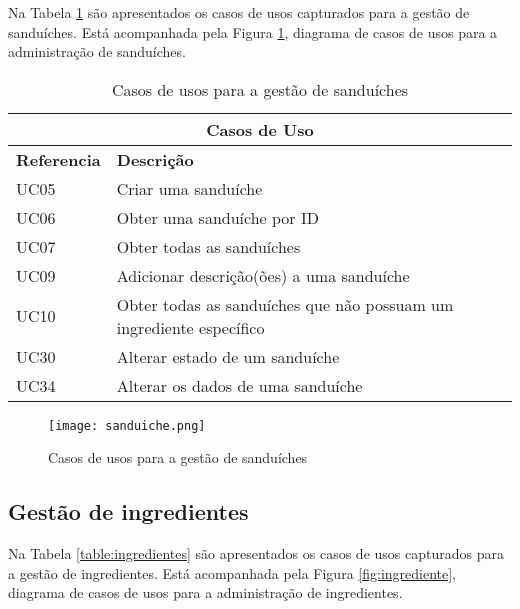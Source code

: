 Na Tabela \ref{table:sanduiche} são apresentados os casos de usos capturados para a gestão de sanduíches. Está acompanhada pela Figura \ref{fig:sanduiche}, diagrama de casos de usos para a administração de sanduíches.

\begin{table}[H]
\caption{Casos de usos para a gestão de sanduíches}
\label{table:sanduiche}
\begin{center}
\begin{tabular}{ |p{2cm}|p{10cm}|  }
\hline
\multicolumn{2}{|c|}{Casos de Uso} \\
\hline
\textbf{Referencia} & \textbf{Descrição} \\
\hline
UC05 & Criar uma sanduíche\\
\hline
UC06 & Obter uma sanduíche por ID\\
\hline
UC07 & Obter todas as sanduíches\\
\hline
UC09 & Adicionar descrição(ões) a uma sanduíche\\
\hline
UC10 & Obter todas as sanduíches que não possuam um ingrediente específico\\
\hline
UC30 & Alterar estado de um sanduíche\\
\hline
UC34 & Alterar os dados de uma sanduíche \\

\hline
\end{tabular} 
\end{center}
\end{table}

\begin{figure}[H]
    \centering
    \texttt{[image: sanduiche.png]}
    \caption{Casos de usos para a gestão de sanduíches}
    \label{fig:sanduiche}
\end{figure}
	

\newpage

\subsection{Gestão de ingredientes}

Na Tabela \ref{table:ingredientes} são apresentados os casos de usos capturados para a gestão de ingredientes. Está acompanhada pela Figura \ref{fig:ingrediente}, diagrama de casos de usos para a administração de ingredientes.

